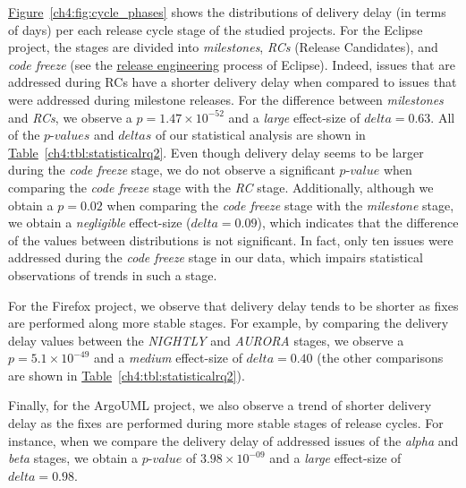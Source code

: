 \noindent{}
\hyperref[ch4:fig:cycle_phases]{Figure}~\ref{ch4:fig:cycle_phases} shows the
distributions of delivery delay (in terms of days) per each release cycle stage
of the studied projects. For the Eclipse project, the stages are divided into
{\em milestones}, {\em RCs} (Release Candidates), and {\em code freeze} (see the
\hyperref[eclipse:releng]{release engineering} process of Eclipse). Indeed,
issues that are addressed during RCs have a shorter delivery delay when compared
to issues that were addressed during milestone releases. For the difference
between {\em milestones} and {\em RCs}, we observe a $p=1.47 \times 10^{-52}$
and a {\em large} effect-size of $delta=0.63$. All of the $p$-$values$ and
$deltas$ of our statistical analysis are shown in
\hyperref[ch4:tbl:statisticalrq2]{Table}~\ref{ch4:tbl:statisticalrq2}. Even
though delivery delay seems to be larger during the {\em code freeze} stage, we
do not observe a significant $p$-$value$ when comparing the {\em code freeze}
stage with the {\em RC} stage. Additionally, although we obtain a $p=0.02$ when
comparing the {\em code freeze} stage with the {\em milestone} stage, we obtain
a {\em negligible} effect-size ($delta=0.09$), which indicates that the
difference of the values between distributions is not significant. In fact, only
ten issues were addressed during the {\em code freeze} stage in our data, which
impairs statistical observations of trends in such a stage.

For the Firefox project, we observe that delivery delay tends to be
shorter as fixes are performed along more stable stages. For example, by
comparing the delivery delay values between the {\em NIGHTLY} and {\em
AURORA} stages, we observe a $p=5.1 \times 10^{-49}$ and a {\em medium}
effect-size of $delta = 0.40$ (the other comparisons are shown in
\hyperref[ch4:tbl:statisticalrq2]{Table}~\ref{ch4:tbl:statisticalrq2}).

Finally, for the ArgoUML project, we also observe a trend of shorter
delivery delay as the fixes are performed during more stable stages of release
cycles. For instance, when we compare the delivery delay of addressed issues of the {\em alpha}
and {\em beta} stages, we obtain a $p$-$value$ of $3.98 \times 10^{-09}$ and a {\em
large} effect-size of $delta = 0.98$.\\

